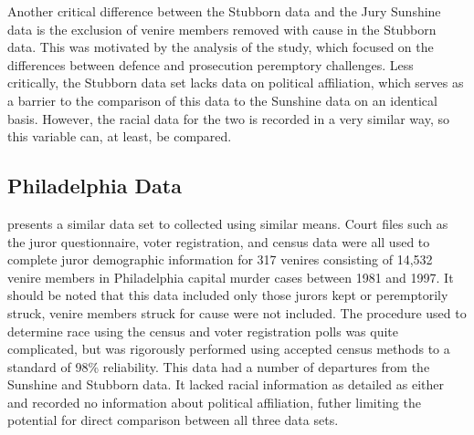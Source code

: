 Another critical difference between the Stubborn data and the Jury Sunshine data is the exclusion of venire members removed with cause in the Stubborn data. This was motivated by the analysis of the study, which focused on the differences between defence and prosecution peremptory challenges. Less critically, the Stubborn data set lacks data on political affiliation, which serves as a barrier to the comparison of this data to the Sunshine data on an identical basis. However, the racial data for the two is recorded in a very similar way, so this variable can, at least, be compared.

\subsection{Philadelphia Data} \label{sec:phillydata}

\cite{PerempChalMurder} presents a similar data set to \cite{StubbornLegacy} collected using similar means. Court files such as
the juror questionnaire, voter registration, and census data were all used to complete juror demographic information for 317
venires consisting of 14,532 venire members in Philadelphia capital murder cases between 1981 and 1997. It should be noted that this data included only those
jurors kept or peremptorily struck, venire members struck for cause were not included. The procedure used to determine
race using the census and voter registration polls was quite complicated, but was rigorously performed using accepted census
methods to a standard of 98\% reliability. This data had a number of departures from the Sunshine and Stubborn data. It lacked racial information as detailed as either and recorded no information about political affiliation, futher limiting the potential for direct comparison between all three data sets.